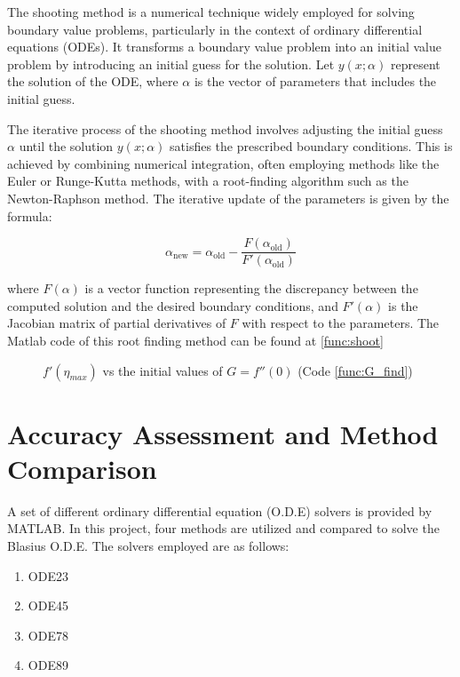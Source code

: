 \documentclass[]{report}
\begin{document}
The shooting method is a numerical technique widely employed for solving boundary value problems, particularly in the context of ordinary differential equations (ODEs). It transforms a boundary value problem into an initial value problem by introducing an initial guess for the solution. Let $y(x; \alpha)$ represent the solution of the ODE, where $\alpha$ is the vector of parameters that includes the initial guess.

The iterative process of the shooting method involves adjusting the initial guess $\alpha$ until the solution $y(x; \alpha)$ satisfies the prescribed boundary conditions. This is achieved by combining numerical integration, often employing methods like the Euler or Runge-Kutta methods, with a root-finding algorithm such as the Newton-Raphson method. The iterative update of the parameters is given by the formula:

\begin{equation}
    \alpha_{\text{new}} = \alpha_{\text{old}} - \frac{F(\alpha_{\text{old}})}{F'(\alpha_{\text{old}})}
\end{equation}

where $F(\alpha)$ is a vector function representing the discrepancy between the computed solution and the desired boundary conditions, and $F'(\alpha)$ is the Jacobian matrix of partial derivatives of $F$ with respect to the parameters. The Matlab code of this root finding method can be found at \ref{func:shoot}


\begin{figure}[h]
    \centering
    
    \caption{$f'(\eta_{max})$ vs the initial values of $G=f''(0)$ (Code \ref{func:G_find})}
    \label{fig:initG}
\end{figure}

\section{Accuracy Assessment and Method Comparison}

A set of different ordinary differential equation (O.D.E) solvers is provided by MATLAB. In this project, four methods are utilized and compared to solve the Blasius O.D.E. The solvers employed are as follows:
\begin{enumerate}
    \item ODE23
    \item ODE45
    \item ODE78
    \item ODE89
\end{enumerate}
\end{document}
